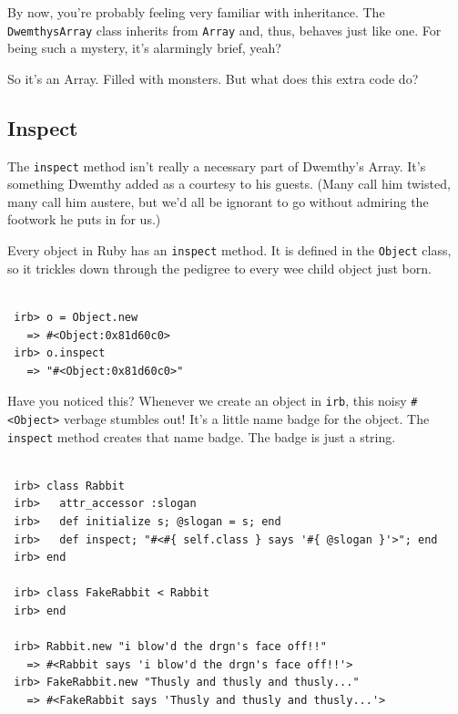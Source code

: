 \documentclass[10pt,twoside]{report}
\begin{document}
By now, you're probably feeling very familiar with inheritance.  The
\lstinline[breaklines=true]|DwemthysArray| class inherits from
\lstinline[breaklines=true]|Array| and, thus, behaves just like one.
For being such a mystery, it's alarmingly brief, yeah?

So it's an Array.  Filled with monsters.  But what does this extra
code do?



\subsection{Inspect}



The \lstinline[breaklines=true]|inspect| method isn't really a
necessary part of Dwemthy's Array.  It's something Dwemthy added as a
courtesy to his guests.  (Many call him twisted, many call him
austere, but we'd all be ignorant to go without admiring the footwork
he puts in for us.)

Every object in Ruby has an \lstinline[breaklines=true]|inspect|
method.  It is defined in the \lstinline[breaklines=true]|Object|
class, so it trickles down through the pedigree to every wee child
object just born.


\begin{lstlisting}

 irb> o = Object.new
   => #<Object:0x81d60c0>
 irb> o.inspect
   => "#<Object:0x81d60c0>"

\end{lstlisting}


Have you noticed this?  Whenever we create an object in
\lstinline[breaklines=true]|irb|, this noisy
\lstinline[breaklines=true]|#<Object>| verbage stumbles out!  It's a
little name badge for the object.  The
\lstinline[breaklines=true]|inspect| method creates that name badge.
The badge is just a string.


\begin{lstlisting}

 irb> class Rabbit
 irb>   attr_accessor :slogan
 irb>   def initialize s; @slogan = s; end
 irb>   def inspect; "#<#{ self.class } says '#{ @slogan }'>"; end
 irb> end

 irb> class FakeRabbit < Rabbit
 irb> end

 irb> Rabbit.new "i blow'd the drgn's face off!!"
   => #<Rabbit says 'i blow'd the drgn's face off!!'>
 irb> FakeRabbit.new "Thusly and thusly and thusly..."
   => #<FakeRabbit says 'Thusly and thusly and thusly...'>

\end{lstlisting}
\end{document}
